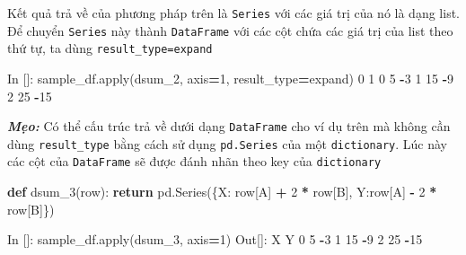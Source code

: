 \documentclass[
]{book}
\makeatletter
\newenvironment{Shaded}{\begin{snugshade}}{\end{snugshade}}
\newcommand{\BuiltInTok}[1]{#1}
\newcommand{\ControlFlowTok}[1]{\textcolor[rgb]{0.13,0.29,0.53}{\textbf{#1}}}
\newcommand{\DecValTok}[1]{\textcolor[rgb]{0.00,0.00,0.81}{#1}}
\newcommand{\KeywordTok}[1]{\textcolor[rgb]{0.13,0.29,0.53}{\textbf{#1}}}
\newcommand{\NormalTok}[1]{#1}
\newcommand{\OperatorTok}[1]{\textcolor[rgb]{0.81,0.36,0.00}{\textbf{#1}}}
\newcommand{\StringTok}[1]{\textcolor[rgb]{0.31,0.60,0.02}{#1}}
\newenvironment{kframe}{%
\medskip{}
\setlength{\fboxsep}{.8em}
 \def\at@end@of@kframe{}%
 \ifinner\ifhmode%
  \def\at@end@of@kframe{\end{minipage}}%
  \begin{minipage}{\columnwidth}%
 \fi\fi%
 \def\FrameCommand##1{\hskip\@totalleftmargin \hskip-\fboxsep
 \colorbox{shadecolor}{##1}\hskip-\fboxsep
     \hskip-\linewidth \hskip-\@totalleftmargin \hskip\columnwidth}%
 \MakeFramed {\advance\hsize-\width
   \@totalleftmargin\z@ \linewidth\hsize
   \@setminipage}}%
 {\par\unskip\endMakeFramed%
 \at@end@of@kframe}
\newenvironment{rmdblock}[1]
  {
  \begin{itemize}
  \renewcommand{\labelitemi}{
    \raisebox{-.7\height}[0pt][0pt]{
      {\setkeys{Gin}{width=3em,keepaspectratio}\texttt{[image: images/\#1]}}
    }
  }
  \setlength{\fboxsep}{1em}
  \begin{kframe}
  \item
  }
  {
  \end{kframe}
  \end{itemize}
  }
\newenvironment{rmdtip}
  {\begin{rmdblock}{tip}}
  {\end{rmdblock}}
\makeatother
\begin{document}
Kết quả trả về của phương pháp trên là \texttt{Series} với các giá trị của nó là dạng list. Để chuyển \texttt{Series} này thành \texttt{DataFrame} với các cột chứa các giá trị của list theo thứ tự, ta dùng \texttt{result\_type=\textquotesingle{}expand\textquotesingle{}}

\begin{Shaded}
\begin{Highlighting}[]
\NormalTok{In []: sample\_df.}\BuiltInTok{apply}\NormalTok{(dsum\_2, axis}\OperatorTok{=}\DecValTok{1}\NormalTok{, result\_type}\OperatorTok{=}\StringTok{\textquotesingle{}expand\textquotesingle{}}\NormalTok{)}
    \DecValTok{0}   \DecValTok{1}
\DecValTok{0}   \DecValTok{5}  \OperatorTok{{-}}\DecValTok{3}
\DecValTok{1}  \DecValTok{15}  \OperatorTok{{-}}\DecValTok{9}
\DecValTok{2}  \DecValTok{25} \OperatorTok{{-}}\DecValTok{15}
\end{Highlighting}
\end{Shaded}

\begin{rmdtip}
\textbf{\emph{Mẹo:}} Có thể cấu trúc trả về dưới dạng \texttt{DataFrame} cho ví dụ trên mà không cần dùng \texttt{result\_type} bằng cách sử dụng \texttt{pd.Series} của một \texttt{dictionary}. Lúc này các cột của \texttt{DataFrame} sẽ được đánh nhãn theo key của \texttt{dictionary}
\end{rmdtip}

\begin{Shaded}
\begin{Highlighting}[]
\KeywordTok{def}\NormalTok{ dsum\_3(row):}
    \ControlFlowTok{return}\NormalTok{ pd.Series(\{}\StringTok{\textquotesingle{}X\textquotesingle{}}\NormalTok{: row[}\StringTok{\textquotesingle{}A\textquotesingle{}}\NormalTok{] }\OperatorTok{+} \DecValTok{2} \OperatorTok{*}\NormalTok{ row[}\StringTok{\textquotesingle{}B\textquotesingle{}}\NormalTok{],  }\StringTok{\textquotesingle{}Y\textquotesingle{}}\NormalTok{:row[}\StringTok{\textquotesingle{}A\textquotesingle{}}\NormalTok{] }\OperatorTok{{-}} \DecValTok{2} \OperatorTok{*}\NormalTok{ row[}\StringTok{\textquotesingle{}B\textquotesingle{}}\NormalTok{]\})}
\end{Highlighting}
\end{Shaded}

\begin{Shaded}
\begin{Highlighting}[]
\NormalTok{In []: sample\_df.}\BuiltInTok{apply}\NormalTok{(dsum\_3, axis}\OperatorTok{=}\DecValTok{1}\NormalTok{)}
\NormalTok{Out[]:}
\NormalTok{    X   Y}
\DecValTok{0}   \DecValTok{5}   \OperatorTok{{-}}\DecValTok{3}
\DecValTok{1}   \DecValTok{15}  \OperatorTok{{-}}\DecValTok{9}
\DecValTok{2}   \DecValTok{25}  \OperatorTok{{-}}\DecValTok{15}
\end{Highlighting}
\end{Shaded}
\end{document}
